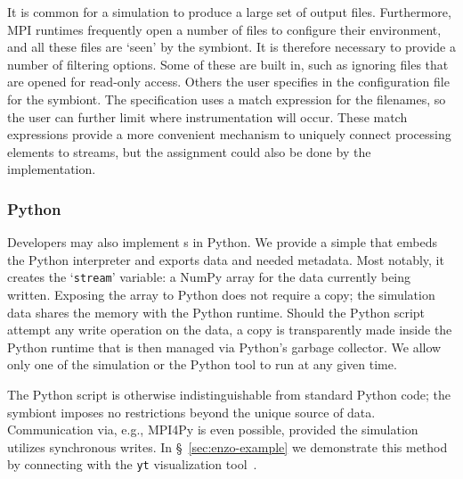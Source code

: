 It is common for a simulation to produce a large set of output
files.  Furthermore, MPI runtimes frequently open a number of files
to configure their environment, and all these files are `seen' by the
symbiont.  It is therefore necessary to provide a number of filtering
options.  Some of these are built in, such as ignoring files that
are opened for read-only access.  Others the user specifies in the
configuration file for the symbiont.  The specification uses a match
expression for the filenames, so the user can further limit where
instrumentation will occur.  These match expressions provide a more
convenient mechanism to uniquely connect processing elements to
streams, but the
assignment could also be done by the \freeprocessor{} implementation.

\subsubsection{Python}
\label{sec:python}

Developers may also implement \freeprocessor{}s in Python.  We provide a simple
\freeprocessor{} that embeds the Python interpreter and exports data
and needed metadata.  Most notably, it creates the
`\texttt{stream}' variable: a NumPy array for the data currently being
written.  Exposing the array to Python does not require a copy; the
simulation data shares the memory with the Python runtime.  Should
the Python script attempt any write operation on the data, a copy is
transparently made inside the Python runtime that is then managed via
Python's garbage collector.  We allow only one of the simulation or the
Python tool to run at any given time.

The Python script is otherwise indistinguishable from standard Python
code; the symbiont imposes no restrictions beyond the unique source of
data.  Communication via, e.g., MPI4Py is even possible, provided the
simulation utilizes synchronous writes.
In \S~\ref{sec:enzo-example} we demonstrate this method by connecting
\freeprocessing{} with the \texttt{yt}
visualization tool~\cite{Turk:2010:yt}.


